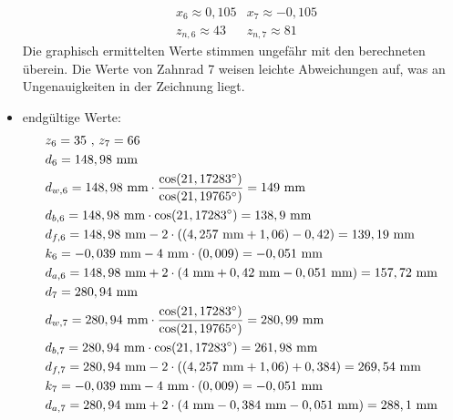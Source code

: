 \begin{itemize}
\begin{align*}
	&x_6 \approx 0,105 &x_7 \approx -0,105 \\
	&z_{n,6} \approx 43 & z_{n,7} \approx 81	
\end{align*}
Die graphisch ermittelten Werte stimmen ungefähr mit den berechneten überein. Die Werte von Zahnrad 7 weisen leichte Abweichungen auf, was an Ungenauigkeiten in der Zeichnung liegt. \\
\item endgültige Werte:
\begin{align*}
	&z_6 = 35 \text{ , } z_7 = 66 \\
	&d_6 = 148,98 \text{ mm} \\
	&d_{w,6} = 148,98  \text{ mm}\cdot \frac{\cos(21,17283^\circ)}{\cos(21,19765^\circ)} = 149 \text{ mm}\\
	&d_{b,6} = 148,98  \text{ mm} \cdot \cos(21,17283^\circ) = 138,9  \text{ mm}\\
	&d_{f,6} = 148,98  \text{ mm} -2 \cdot ((4,257 \text{ mm}+1,06)-0,42) = 139,19 \text{ mm}\\
	&k_6 = -0,039 \text{ mm} -4 \text{ mm} \cdot (0,009) =- 0,051 \text{ mm}\\
	&d_{a,6} = 148,98  \text{ mm} +2 \cdot (4\text{ mm}+0,42 \text{ mm} -0,051 \text{ mm}) = 157,72\text{ mm}\\
	&d_7 =280,94 \text{ mm} \\
	&d_{w,7} =280,94  \text{ mm}\cdot \frac{\cos(21,17283^\circ)}{\cos(21,19765^\circ)} = 280,99  \text{ mm}\\
	&d_{b,7} = 280,94  \text{ mm} \cdot \cos(21,17283^\circ) = 261,98 \text{ mm}\\
	&d_{f,7} = 280,94  \text{ mm} -2 \cdot ((4,257 \text{ mm}+1,06)+0,384) = 269,54 \text{ mm}\\
	&k_7 = -0,039 \text{ mm} -4 \text{ mm} \cdot (0,009) =- 0,051 \text{ mm}\\
	&d_{a,7} = 280,94  \text{ mm} +2 \cdot (4\text{ mm}-0,384 \text{ mm} -0,051 \text{ mm}) = 288,1\text{ mm}
\end{align*}	
\end{itemize}
\newpage
